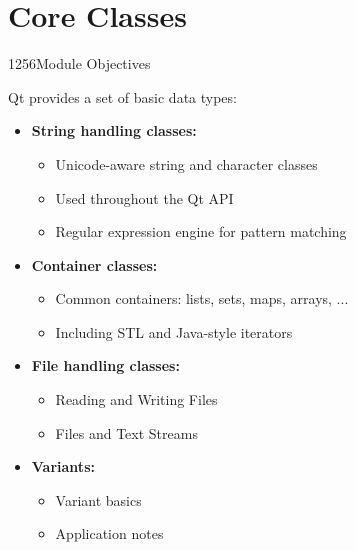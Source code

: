 %
%
%
%

\section{Core Classes}

\begin{slide}{1256}{Module Objectives}
\label{basic-types}

Qt provides a set of basic data types:

\begin{itemize}
    \item \textbf{String handling classes:}
      \begin{itemize}
      \item Unicode-aware string and character classes
      \item Used throughout the Qt API
      \item Regular expression engine for pattern matching
      \end{itemize}
\item \textbf{Container classes:}
  \begin{itemize}
  \item Common containers: lists, sets, maps, arrays, ...
  \item Including STL and Java-style iterators
  \end{itemize}
\item \textbf{File handling classes:}
  \begin{itemize}
  \item Reading and Writing Files
  \item Files and Text Streams  
\end{itemize}
\item \textbf{Variants:}
  \begin{itemize}
  \item Variant basics
  \item Application notes
\end{itemize}

\end{itemize}

\end{slide}







